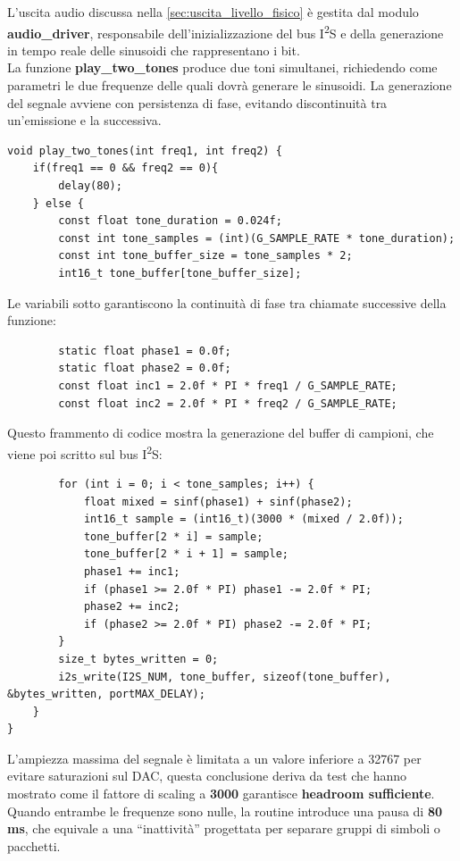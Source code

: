 L’uscita audio discussa nella \autoref{sec:uscita_livello_fisico} è gestita dal modulo \textbf{audio\_driver}, 
responsabile dell’inizializzazione del bus I\textsuperscript{2}S e della generazione in tempo reale delle sinusoidi che rappresentano i bit. \\
La funzione \textbf{play\_two\_tones} produce due toni simultanei, richiedendo come parametri le due frequenze delle quali dovrà generare le sinusoidi.
La generazione del segnale avviene con persistenza di fase, evitando discontinuità tra un’emissione e la successiva. 


\begin{verbatim}
void play_two_tones(int freq1, int freq2) {
    if(freq1 == 0 && freq2 == 0){
        delay(80);
    } else {
        const float tone_duration = 0.024f;
        const int tone_samples = (int)(G_SAMPLE_RATE * tone_duration);
        const int tone_buffer_size = tone_samples * 2;
        int16_t tone_buffer[tone_buffer_size];
    \end{verbatim}
Le variabili sotto garantiscono la continuità di fase tra chiamate successive della funzione:
\begin{verbatim}
        static float phase1 = 0.0f;
        static float phase2 = 0.0f;
        const float inc1 = 2.0f * PI * freq1 / G_SAMPLE_RATE;
        const float inc2 = 2.0f * PI * freq2 / G_SAMPLE_RATE;
    \end{verbatim}
Questo frammento di codice mostra la generazione del buffer di campioni,
 che viene poi scritto sul bus I\textsuperscript{2}S:
\begin{verbatim}
        for (int i = 0; i < tone_samples; i++) {
            float mixed = sinf(phase1) + sinf(phase2);
            int16_t sample = (int16_t)(3000 * (mixed / 2.0f));
            tone_buffer[2 * i] = sample;
            tone_buffer[2 * i + 1] = sample;
            phase1 += inc1;
            if (phase1 >= 2.0f * PI) phase1 -= 2.0f * PI;
            phase2 += inc2;
            if (phase2 >= 2.0f * PI) phase2 -= 2.0f * PI;
        }
        size_t bytes_written = 0;
        i2s_write(I2S_NUM, tone_buffer, sizeof(tone_buffer), &bytes_written, portMAX_DELAY);
    }
}
\end{verbatim}

L’ampiezza massima del segnale è limitata a un valore inferiore a 32767 per evitare saturazioni sul DAC, questa conclusione deriva
 da test che hanno mostrato come 
 il fattore di scaling a \textbf{3000} garantisce \textbf{headroom sufficiente}. Quando entrambe le frequenze sono nulle,
  la routine introduce una pausa di \textbf{80 ms}, che equivale a una “inattività” progettata per separare gruppi di
   simboli o pacchetti.

